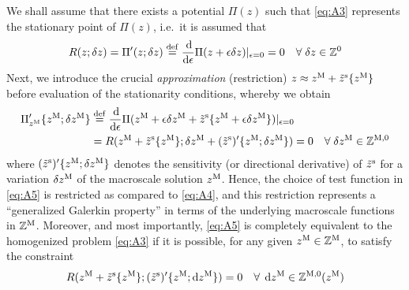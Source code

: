 \documentclass[12pt,a4paper]{article}
\begin{document}
We shall assume that there exists a potential $\Pi(z)$ such that \cref{eq:A3} represents the stationary point of $\Pi(z)$, i.e.\ it is assumed that
\begin{align}
\label{eq:A4} R(z;\delta z) = \Pi'(z;\delta z) \overset{\mathrm{def}}{=} \frac{\operatorname{d \!}}{\operatorname{d \!}\epsilon}\Pi(z+\epsilon\delta z)|_{\epsilon = 0} = 0\quad \forall\;\delta z \in \mathbb{Z}^0
\end{align}
Next, we introduce the crucial \emph{approximation} (restriction) $z \approx z^{\mathrm{M}} + \tilde{z}^{\mathrm{s}}\{z^{\mathrm{M}}\}$ before evaluation of the stationarity conditions, whereby we obtain
\begin{align}
\label{eq:A5} \Pi_{z^{\mathrm{M}}}'\{z^{\mathrm{M}};\delta z^{\mathrm{M}}\} & \overset{\mathrm{def}}{=}
\frac{\operatorname{d \!}}{\operatorname{d \!}\epsilon}\Pi(z^{\mathrm{M}}+\epsilon \delta z^{\mathrm{M}}+\tilde{z}^{\mathrm{s}}\{z^{\mathrm{M}}+\epsilon \delta z^{\mathrm{M}}\})|_{\epsilon = 0} \nonumber \\
& =
R(z^{\mathrm{M}} + \tilde{z}^{\mathrm{s}}\{z^{\mathrm{M}}\}; \delta z^{\mathrm{M}} + (\tilde{z}^{\mathrm{s}})'\{z^{\mathrm{M}};\delta z^{\mathrm{M}}\}) = 0\quad \forall\;\delta z^{\mathrm{M}}\in\mathbb{Z}^{\mathrm{M},0}
\end{align}
where $(\tilde{z}^{\mathrm{s}})'\{z^{\mathrm{M}};\delta z^{\mathrm{M}}\}$ denotes the sensitivity (or directional derivative) of $\tilde z^{\mathrm{s}}$ for a variation $\delta z^{\mathrm{M}}$ of the macroscale solution $z^{\mathrm{M}}$.
Hence, the choice of test function in \cref{eq:A5} is restricted as compared to \cref{eq:A4}, and this restriction represents a ``generalized Galerkin property'' in terms of the underlying macroscale functions in $\mathbb{Z}^{\mathrm{M}}$.
Moreover, and most importantly, \cref{eq:A5} is completely equivalent to the homogenized problem \cref{eq:A3} if it is possible, for any given $z^{\mathrm{M}}\in\mathbb{Z}^{\mathrm{M}}$, to satisfy the constraint
\begin{align}
\label{eq:A6a} R(z^{\mathrm{M}} + \tilde z^{\mathrm{s}}\{z^{\mathrm{M}}\}; (\tilde{z}^{\mathrm{s}})'\{z^{\mathrm{M}};\operatorname{d \!} z^{\mathrm{M}}\}) = 0\quad \forall\;\operatorname{d \!} z^{\mathrm{M}}\in\mathbb{Z}^{\mathrm{M},0}(z^{\mathrm{M}})
\end{align}
\end{document}
